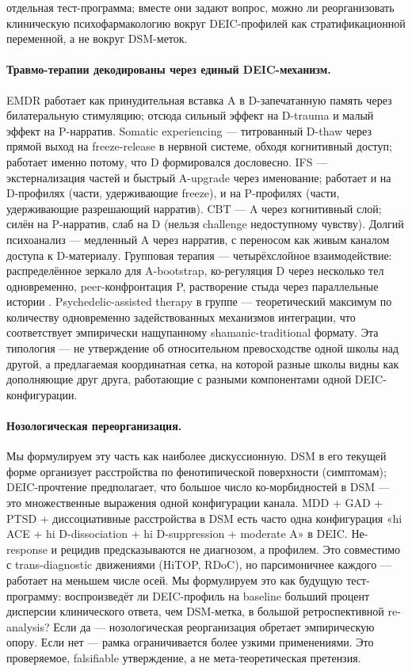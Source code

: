 отдельная тест-программа; вместе они задают вопрос, можно ли реорганизовать клиническую психофармакологию вокруг DEIC-профилей как стратификационной переменной, а не вокруг DSM-меток.

\paragraph{Травмо-терапии декодированы через единый DEIC-механизм.} EMDR работает как принудительная вставка A в D-запечатанную память через билатеральную стимуляцию; отсюда сильный эффект на D-trauma и малый эффект на P-нарратив. Somatic experiencing \citep{levine2015} --- титрованный D-thaw через прямой выход на freeze-release в нервной системе, обходя когнитивный доступ; работает именно потому, что D формировался дословесно. IFS \citep{schwartz1995} --- экстернализация частей и быстрый A-upgrade через именование; работает и на D-профилях (части, удерживающие freeze), и на P-профилях (части, удерживающие разрешающий нарратив). CBT --- A через когнитивный слой; силён на P-нарратив, слаб на D (нельзя challenge недоступному чувству). Долгий психоанализ --- медленный A через нарратив, с переносом как живым каналом доступа к D-материалу. Групповая терапия --- четырёхслойное взаимодействие: распределённое зеркало для A-bootstrap, ко-регуляция D через несколько тел одновременно, peer-конфронтация P, растворение стыда через параллельные истории \citep[см. собранные обзоры по common factors в][]{wampold2015}. Psychedelic-assisted therapy в группе --- теоретический максимум по количеству одновременно задействованных механизмов интеграции, что соответствует эмпирически нащупанному shamanic-traditional формату. Эта типология --- не утверждение об относительном превосходстве одной школы над другой, а предлагаемая координатная сетка, на которой разные школы видны как дополняющие друг друга, работающие с разными компонентами одной DEIC-конфигурации.

\paragraph{Нозологическая переорганизация.} Мы формулируем эту часть как наиболее дискуссионную. DSM в его текущей форме организует расстройства по фенотипической поверхности (симптомам); DEIC-прочтение предполагает, что большое число ко-морбидностей в DSM --- это множественные выражения одной конфигурации канала. MDD + GAD + PTSD + диссоциативные расстройства в DSM есть часто одна конфигурация «hi ACE + hi D-dissociation + hi D-suppression + moderate A» в DEIC. Не-response и рецидив предсказываются не диагнозом, а профилем. Это совместимо с trans-diagnostic движениями (HiTOP, RDoC), но парсимоничнее каждого --- работает на меньшем числе осей. Мы формулируем это как будущую тест-программу: воспроизведёт ли DEIC-профиль на baseline больший процент дисперсии клинического ответа, чем DSM-метка, в большой ретроспективной re-analysis? Если да --- нозологическая реорганизация обретает эмпирическую опору. Если нет --- рамка ограничивается более узкими применениями. Это проверяемое, falsifiable утверждение, а не мета-теоретическая претензия.

